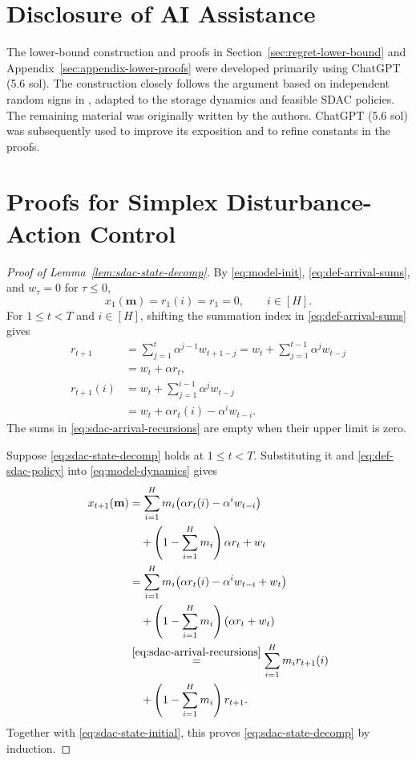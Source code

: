 \documentclass[journal]{IEEEtran}
\theoremstyle{remark}
\begin{document}
\section*{Disclosure of AI Assistance}
The lower-bound construction and proofs in Section~\ref{sec:regret-lower-bound}
and Appendix~\ref{sec:appendix-lower-proofs} were developed primarily using
ChatGPT (5.6 sol). The construction closely follows the argument based on
independent random signs in
\cite[Sec.~2.3, footnote~3]{hazan2007logarithmic}, adapted to the storage
dynamics and feasible SDAC policies. The remaining material was originally
written by the authors. ChatGPT (5.6 sol) was subsequently used to improve
its exposition and to refine constants in the proofs.


\appendices
\section{Proofs for Simplex Disturbance-Action Control}
\label{sec:appendix-sdac-proofs}

\begin{proof}[Proof of Lemma~\ref{lem:sdac-state-decomp}]
By \eqref{eq:model-init}, \eqref{eq:def-arrival-sums}, and $w_\tau=0$
for $\tau\le0$,
\begin{equation}
\label{eq:sdac-state-initial}
x_1(\mathbf{m})=r_1(i)=r_1=0,\qquad i\in[H].
\end{equation}
For $1\le t<T$ and $i\in[H]$, shifting the summation index in
\eqref{eq:def-arrival-sums} gives
\begin{equation}
\label{eq:sdac-arrival-recursions}
\begin{aligned}
r_{t+1}
&=\sum_{j=1}^{t}\alpha^{j-1}w_{t+1-j}
 =w_t+\sum_{j=1}^{t-1}\alpha^j w_{t-j} \\
&=w_t+\alpha r_t, \\
r_{t+1}(i)
&=w_t+\sum_{j=1}^{i-1}\alpha^j w_{t-j} \\
&=w_t+\alpha r_t(i)-\alpha^i w_{t-i}.
\end{aligned}
\end{equation}
The sums in \eqref{eq:sdac-arrival-recursions} are empty when their upper
limit is zero.

Suppose \eqref{eq:sdac-state-decomp} holds at $1\le t<T$. Substituting it
and \eqref{eq:def-sdac-policy} into \eqref{eq:model-dynamics} gives
\begin{align*}
x_{t+1}(\mathbf{m})
&=\sum_{i=1}^H m_i
\bigl(\alpha r_t(i)-\alpha^i w_{t-i}\bigr) \\
&\quad
+\left(1-\sum_{i=1}^H m_i\right)\alpha r_t+w_t \\
&=\sum_{i=1}^H m_i
\bigl(\alpha r_t(i)-\alpha^i w_{t-i}+w_t\bigr)\\
&\quad
+\left(1-\sum_{i=1}^H m_i\right)(\alpha r_t+w_t)\\
&\overset{\eqref{eq:sdac-arrival-recursions}}{=}
\sum_{i=1}^H m_i r_{t+1}(i)\\
&\quad
+\left(1-\sum_{i=1}^H m_i\right)r_{t+1}.
\end{align*}
Together with \eqref{eq:sdac-state-initial}, this proves
\eqref{eq:sdac-state-decomp} by induction.
\end{proof}
\end{document}
